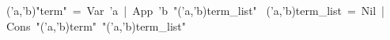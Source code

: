 \begin{isabelle}%
\ ('a,'b){"}term{"}\ =\ Var\ 'a\ |\ App\ 'b\ {"}('a,'b)term\_list{"}\isanewline
{}\ ('a,'b)term\_list\ =\ Nil\ |\ Cons\ {"}('a,'b)term{"}\ {"}('a,'b)term\_list{"}\end{isabelle}%
